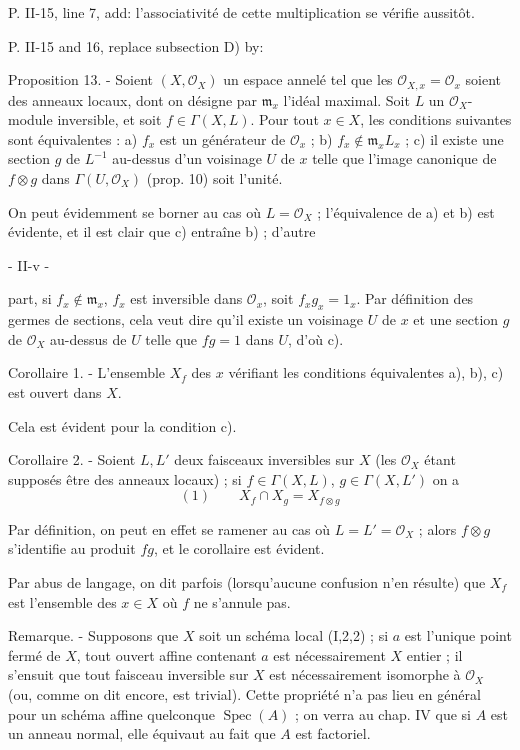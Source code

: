 P. II-15, line 7, add:
l'associativité de cette multiplication se vérifie aussitôt.

P. II-15 and 16, replace subsection D) by:

Proposition 13. - Soient $(X, \mathcal{O}_X)$ un espace annelé tel que les $\mathcal{O}_{X,x} = \mathcal{O}_x$ soient des anneaux locaux, dont on désigne par $\mathfrak{m}_x$ l'idéal maximal. Soit $L$ un $\mathcal{O}_X$-module inversible, et soit $f \in \Gamma(X, L)$. Pour tout $x \in X$, les conditions suivantes sont équivalentes : a) $f_x$ est un générateur de $\mathcal{O}_x$ ; b) $f_x \notin \mathfrak{m}_x L_x$ ; c) il existe une section $g$ de $L^{-1}$ au-dessus d'un voisinage $U$ de $x$ telle que l'image canonique de $f \otimes g$ dans $\Gamma(U, \mathcal{O}_X)$ (prop. 10) soit l'unité.

On peut évidemment se borner au cas où $L=\mathcal{O}_X$ ; l'équivalence de a) et b) est évidente, et il est clair que c) entraîne b) ; d'autre

\newpage


- II-v -

part, si $f_x \notin \mathfrak{m}_x$, $f_x$ est inversible dans $\mathcal{O}_x$, soit $f_x g_x = 1_x$. Par définition des germes de sections, cela veut dire qu'il existe un voisinage $U$ de $x$ et une section $g$ de $\mathcal{O}_X$ au-dessus de $U$ telle que $fg = 1$ dans $U$, d'où c).

Corollaire 1. - L'ensemble $X_f$ des $x$ vérifiant les conditions équivalentes a), b), c) est ouvert dans $X$.

Cela est évident pour la condition c).

Corollaire 2. - Soient $L, L'$ deux faisceaux inversibles sur $X$ (les $\mathcal{O}_X$ étant supposés être des anneaux locaux) ; si $f \in \Gamma(X, L)$, $g \in \Gamma(X, L')$ on a
$$(1) \qquad X_f \cap X_g = X_{f \otimes g}$$

Par définition, on peut en effet se ramener au cas où $L=L'=\mathcal{O}_X$ ; alors $f \otimes g$ s'identifie au produit $fg$, et le corollaire est évident.

Par abus de langage, on dit parfois (lorsqu'aucune confusion n'en résulte) que $X_f$ est l'ensemble des $x \in X$ où $f$ ne s'annule pas.

Remarque. - Supposons que $X$ soit un schéma local (I,2,2) ; si $a$ est l'unique point fermé de $X$, tout ouvert affine contenant $a$ est nécessairement $X$ entier ; il s'ensuit que tout faisceau inversible sur $X$ est nécessairement isomorphe à $\mathcal{O}_X$ (ou, comme on dit encore, est trivial). Cette propriété n'a pas lieu en général pour un schéma affine quelconque $\operatorname{Spec}(A)$ ; on verra au chap. IV que si $A$ est un anneau normal, elle équivaut au fait que $A$ est factoriel.

